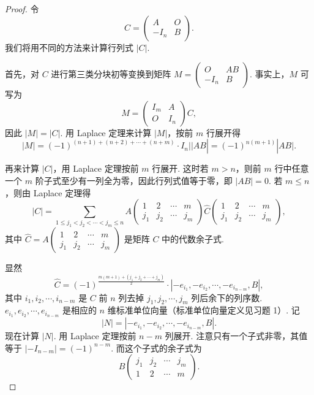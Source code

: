 \begin{proof}
    令
    $$
    C =
    \begin{pmatrix}
    A & O \\
    -I_n & B
    \end{pmatrix}.
    $$
    我们将用不同的方法来计算行列式 $|C|$.

    首先，对 $C$ 进行第三类分块初等变换到矩阵 $M = \begin{pmatrix} O & AB \\ -I_n & B \end{pmatrix}$. 事实上，$M$ 可写为
    $$
    M =
    \begin{pmatrix}
    I_m & A \\
    O & I_n
    \end{pmatrix}
    C,
    $$
    因此 $|M| = |C|$. 用 Laplace 定理来计算 $|M|$，按前 $m$ 行展开得
    $$
    |M| = (-1)^{(n+1)+(n+2)+\cdots+(n+m)} \cdot I_n ||AB| = (-1)^{n(m+1)} |AB|.
    $$

    再来计算 $|C|$，用 Laplace 定理按前 $m$ 行展开. 这时若 $m > n$，则前 $m$ 行中任意一个 $m$ 阶子式至少有一列全为零，因此行列式值等于零，即 $|AB| = 0$. 若 $m \leqslant n$，则由 Laplace 定理得
    $$
    |C| = \sum_{1 \leqslant j_1 < j_2 < \cdots < j_m \leqslant n} A
    \begin{pmatrix}
    1 & 2 & \cdots & m \\
    j_1 & j_2 & \cdots & j_m
    \end{pmatrix}
    \hat{C}
    \begin{pmatrix}
    1 & 2 & \cdots & m \\
    j_1 & j_2 & \cdots & j_m
    \end{pmatrix},
    $$
    其中 $\hat{C} = A \begin{pmatrix} 1 & 2 & \cdots & m \\ j_1 & j_2 & \cdots & j_m \end{pmatrix}$ 是矩阵 $C$ 中的代数余子式.

    显然
    $$
    \hat{C} = (-1)^{\frac{m(m+1) + (j_1 + j_2 + \cdots + j_m)}{2}} \cdot | - e_{i_1}, - e_{i_2}, \cdots, - e_{i_{n-m}}, B |,
    $$
    其中 $i_1, i_2, \cdots, i_{n-m}$ 是 $C$ 前 $n$ 列去掉 $j_1, j_2, \cdots, j_m$ 列后余下的列序数. $e_{i_1}, e_{i_2}, \cdots, e_{i_{n-m}}$ 是相应的 $n$ 维标准单位向量（标准单位向量定义见习题 1）. 记
    $$
    |N| = | - e_{i_1}, - e_{i_2}, \cdots, - e_{i_{n-m}}, B |.
    $$
    现在计算 $|N|$. 用 Laplace 定理按前 $n-m$ 列展开. 注意只有一个子式非零，其值等于 $| - I_{n-m}| = (-1)^{n-m}$. 而这个子式的余子式为
    $$
    B \begin{pmatrix} j_1 & j_2 & \cdots & j_m \\ 1 & 2 & \cdots & m \end{pmatrix}.
    $$


\end{proof}
